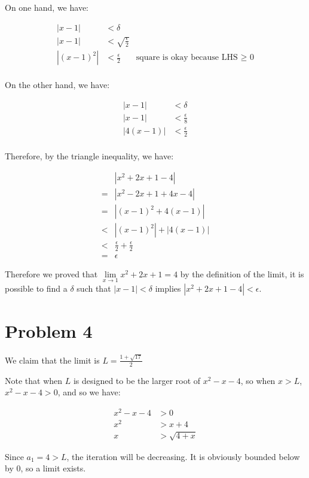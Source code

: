 \documentclass{article}
\begin{document}
On one hand, we have:

\begin{align*}
  |x - 1| &< \delta \\
  |x - 1| &< \sqrt{\frac{\epsilon}{2}} \\
  |(x-1)^2| &< \frac{\epsilon}{2} &\text{square is okay because LHS $\ge$ 0} \\
\end{align*}

On the other hand, we have:

\begin{align*}
  |x - 1| &< \delta \\
  |x - 1| &< \frac{\epsilon}{8} \\
  |4(x-1)| &< \frac{\epsilon}{2} \\
\end{align*}

Therefore, by the triangle inequality, we have:

\begin{align*}
   & |x^2 + 2x + 1 - 4 | \\
  =& |x^2 - 2x + 1 + 4x - 4| \\
  =& |(x-1)^2 + 4(x-1)| \\
  <& |(x-1)^2| + |4(x-1)| \\
  <& \frac{\epsilon}{2} + \frac{\epsilon}{2} \\
  =& \epsilon
\end{align*}

Therefore we proved that $ \lim\limits_{x \to 1} x^2 + 2x + 1 = 4 $ by the definition of the limit, it is possible to find a $ \delta $ such that $ |x - 1| < \delta $ implies $ |x^2 + 2x + 1 - 4| < \epsilon $.

\section*{Problem 4}

We claim that the limit is $ L = \frac{1 + \sqrt{17}}{2} $

Note that when $ L $ is designed to be the larger root of $ x^2 - x - 4 $, so when $ x > L $, $ x^2 - x - 4 > 0 $, and so we have:

\begin{eqnarray*}
  x^2 - x - 4 &> 0 \\
  x^2 &> x + 4 \\
  x &> \sqrt{4 + x}
\end{eqnarray*}

Since $ a_1 = 4 > L $, the iteration will be decreasing. It is obviously bounded below by 0, so a limit exists.
\end{document}
